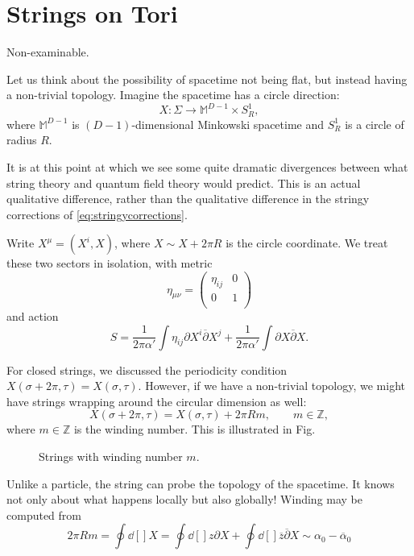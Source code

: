 \chapter{Strings on Tori}%
\label{cha:strings_on_tori}

\begin{leftbar}
  Non-examinable.
\end{leftbar}

Let us think about the possibility of spacetime not being flat, but instead having a non-trivial topology.
Imagine the spacetime has a circle direction:
\begin{equation}
  X \colon \Sigma \to \mathbb{M}^{D-1} \times S^1_{R},
\end{equation}
where $\mathbb{M}^{D-1}$ is $(D-1)$-dimensional Minkowski spacetime and $S^1_{R}$ is a circle of radius $R$.

It is at this point at which we see some quite dramatic divergences between what string theory and quantum field theory would predict.  This is an actual qualitative difference, rather than the qualitative difference in the stringy corrections of \eqref{eq:stringycorrections}.

Write $X^{\mu} = (X^i, X)$, where $X \sim X + 2 \pi R$ is the circle coordinate.
We treat these two sectors in isolation, with metric
\begin{equation}
  \eta_{\mu\nu} = 
  \begin{pmatrix}
   \eta_{ij} & 0 \\
   0 & 1 \\
  \end{pmatrix}
\end{equation}
and action
\begin{equation}
  S = \frac{1}{2\pi \alpha'} \int \eta_{ij} \partial X^{i} \overline{\partial}{} X^{j} + \frac{1}{2 \pi \alpha'} \int \partial X \overline{\partial}{} X.
\end{equation}

For closed strings, we discussed the periodicity condition $X(\sigma + 2 \pi, \tau) = X(\sigma, \tau)$.
However, if we have a non-trivial topology, we might have strings wrapping around the circular dimension as well:
\begin{equation}
  X(\sigma + 2 \pi, \tau) = X(\sigma, \tau) + 2\pi R m, \qquad m \in \mathbb{Z},
\end{equation}
where $m \in \mathbb{Z}$ is the winding number. This is illustrated in Fig.
\begin{figure}[tbhp]
  \centering
  \caption{Strings with winding number $m$.}
  \label{fig:l24f1}
\end{figure}
Unlike a particle, the string can probe the topology of the spacetime. It knows not only about what happens locally but also globally!
Winding may be computed from
\begin{equation}
  2 \pi R m = \oint \dd[]{X} = \oint \dd[]{z} \partial X + \oint \dd[]{\overline{z}{}} \overline{\partial}{} X \sim \alpha_0 - \overline{\alpha}{}_0
\end{equation}

